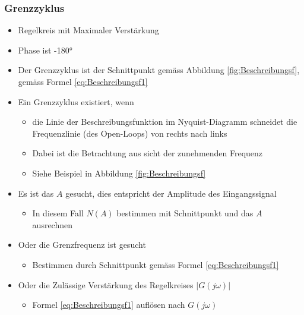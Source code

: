 \subsubsection{Grenzzyklus}
\begin{itemize}
	\item Regelkreis mit Maximaler Verstärkung 
	\item Phase ist \ang{-180}
	\item Der Grenzzyklus ist der Schnittpunkt gemäss Abbildung \ref{fig:Beschreibungsf}, gemäss Formel \ref{eq:Beschreibungsf1}
	\item Ein Grenzzyklus existiert, wenn
	\begin{itemize}
		\item die Linie der Beschreibungsfunktion im Nyquist-Diagramm schneidet die Frequenzlinie (des Open-Loops) von rechts nach links
		\item Dabei ist die Betrachtung aus sicht der zunehmenden Frequenz
		\item Siehe Beispiel in Abbildung \ref{fig:Beschreibungsf}
	\end{itemize}
	\item Es ist das $A$ gesucht, dies entspricht der Amplitude des Eingangssignal
	\begin{itemize}
		\item In diesem Fall $N(A)$ bestimmen mit Schnittpunkt und das $A$ ausrechnen
	\end{itemize}
	\item Oder die Grenzfrequenz ist gesucht
	\begin{itemize}
		\item Bestimmen durch Schnittpunkt gemäss Formel \ref{eq:Beschreibungsf1}
	\end{itemize}
	\item Oder die Zulässige Verstärkung des Regelkreises $\lvert G(j\omega)\rvert$ 
	\begin{itemize}
		\item Formel \ref{eq:Beschreibungsf1} auflösen nach $G(j\omega)$
	\end{itemize}
\end{itemize}

